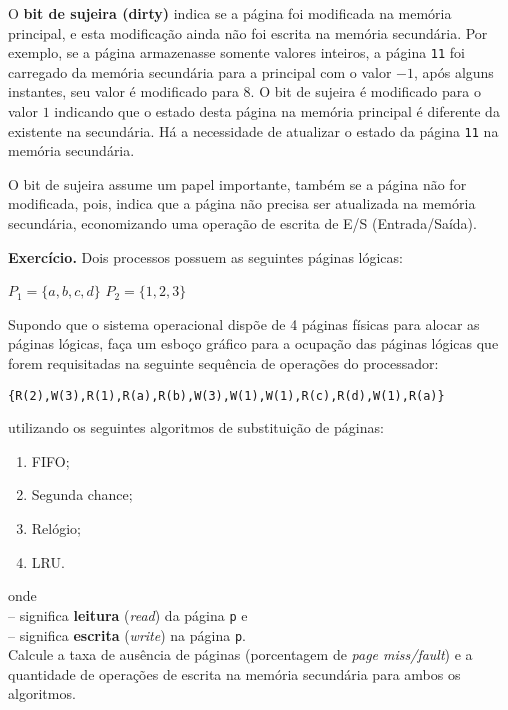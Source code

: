 O {\bf bit de sujeira (dirty)} indica se a página foi modificada na
memória principal, e esta modificação ainda não foi escrita na memória
secundária. Por exemplo, se a página armazenasse somente valores
inteiros, a página {\tt 11} foi carregado da memória secundária para a
principal com o valor $-1$, após alguns instantes, seu valor é
modificado para $8$.  O bit de sujeira é modificado para o valor $1$
indicando que o estado desta página na memória principal é diferente
da existente na secundária. Há a necessidade de atualizar o estado da
página {\tt 11} na memória secundária.

O bit de sujeira assume um papel importante, também se a página não
for modificada, pois, indica que a página não precisa ser atualizada
na memória secundária, economizando uma operação de escrita de E/S
(Entrada/Saída).

{\color{blue}\bf Exercício.} Dois processos possuem as seguintes páginas lógicas:

\begin{center}
$P_1= \{a,b,c,d\}$
$P_2= \{1,2,3\}$
\end{center}

Supondo que o sistema operacional dispõe de 4 páginas físicas
para alocar as páginas lógicas, faça um esboço gráfico
para a ocupação das páginas lógicas que forem requisitadas
na seguinte sequência de operações do processador:

\begin{center}
{\tt\{R(2),W(3),R(1),R(a),R(b),W(3),W(1),W(1),R(c),R(d),W(1),R(a)\}}
\end{center}
utilizando os seguintes algoritmos de substituição de p\'aginas:\\
\begin{enumerate}
\item FIFO;
\item Segunda chance;
\item Relógio;
\item LRU.
\end{enumerate}

\noindent onde\\
 -- significa {\bf leitura} ({\em read}) da página {\tt p} e\\
 -- significa {\bf escrita} ({\em write}) na página {\tt p}.\\
\bigskip
Calcule a taxa de aus\^encia de p\'aginas (porcentagem de {\em page
miss/fault}) e a quantidade de operações de escrita na memória
secundária para ambos os algoritmos.


